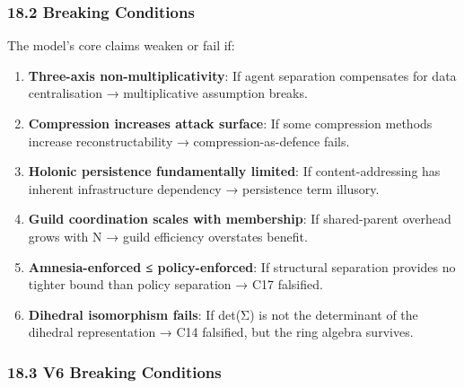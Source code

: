 \documentclass[
]{article}
\providecommand{\tightlist}{%
  \setlength{\itemsep}{0pt}\setlength{\parskip}{0pt}}
\begin{document}
\subsubsection{18.2 Breaking Conditions}\label{breaking-conditions}

The model's core claims weaken or fail if:

\begin{enumerate}
\def\labelenumi{\arabic{enumi}.}
\tightlist
\item
  \textbf{Three-axis non-multiplicativity}: If agent separation
  compensates for data centralisation → multiplicative assumption
  breaks.
\item
  \textbf{Compression increases attack surface}: If some compression
  methods increase reconstructability → compression-as-defence fails.
\item
  \textbf{Holonic persistence fundamentally limited}: If
  content-addressing has inherent infrastructure dependency →
  persistence term illusory.
\item
  \textbf{Guild coordination scales with membership}: If shared-parent
  overhead grows with N → guild efficiency overstates benefit.
\item
  \textbf{Amnesia-enforced ≤ policy-enforced}: If structural separation
  provides no tighter bound than policy separation → C17 falsified.
\item
  \textbf{Dihedral isomorphism fails}: If det(Σ) is not the determinant
  of the dihedral representation → C14 falsified, but the ring algebra
  survives.
\end{enumerate}

\subsubsection{18.3 V6 Breaking
Conditions}\label{v6-breaking-conditions}
\end{document}
